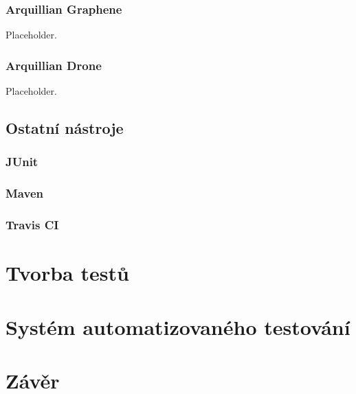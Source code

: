 \documentclass[
    color,   %
	table,   %
    twoside, %
]{fithesis3}
\begin{document}
  \subsection{Arquillian Graphene}
    Placeholder.
  \subsection{Arquillian Drone}
    Placeholder.
  \section{Ostatní nástroje}
   \subsection{JUnit}
  \subsection{Maven}
   \subsection{Travis CI}
  \chapter{Tvorba testů}
  \chapter{Systém automatizovaného testování}
  \chapter{Závěr}
  
\end{document}
